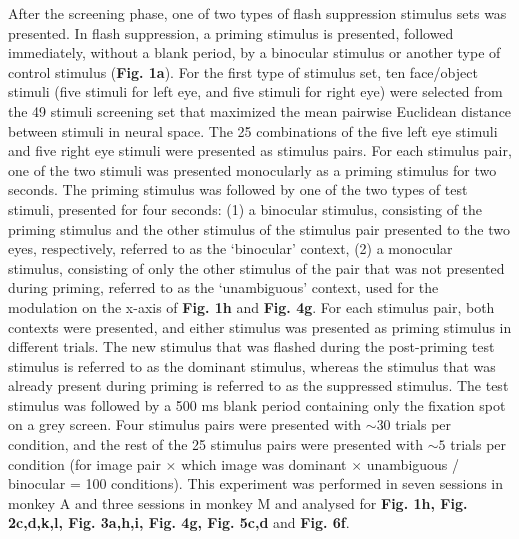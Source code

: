 \documentclass{article}
\begin{document}
After the screening phase, one of two types of flash suppression stimulus sets was presented. In flash suppression, a priming stimulus is presented, followed immediately, without a blank period, by a binocular stimulus or another type of control stimulus (\textbf{Fig. 1a}). For the first type of stimulus set, ten face/object stimuli (five stimuli for left eye, and five stimuli for right eye) were selected from the 49 stimuli screening set that maximized the mean pairwise Euclidean distance between stimuli in neural space. The 25 combinations of the five left eye stimuli and five right eye stimuli were presented as stimulus pairs. For each stimulus pair, one of the two stimuli was presented monocularly as a priming stimulus for two seconds. The priming stimulus was followed by one of the two types of test stimuli, presented for four seconds: (1) a binocular stimulus, consisting of the priming stimulus and the other stimulus of the stimulus pair presented to the two eyes, respectively, referred to as the `binocular' context, (2) a monocular stimulus, consisting of only the other stimulus of the pair that was not presented during priming, referred to as the `unambiguous' context, used for the modulation on the x-axis of \textbf{Fig. 1h} and \textbf{Fig. 4g}. For each stimulus pair, both contexts were presented, and either stimulus was presented as priming stimulus in different trials. The new stimulus that was flashed during the post-priming test stimulus is referred to as the dominant stimulus, whereas the stimulus that was already present during priming is referred to as the suppressed stimulus. The test stimulus was followed by a 500 ms blank period containing only the fixation spot on a grey screen. Four stimulus pairs were presented with ${\sim}30$ trials per condition, and the rest of the 25 stimulus pairs were presented with ${\sim}5$ trials per condition (for image pair $\times$ which image was dominant $\times$ unambiguous / binocular = 100 conditions). This experiment was performed in seven sessions in monkey A and three sessions in monkey M and analysed for \textbf{Fig. 1h, Fig. 2c,d,k,l, Fig. 3a,h,i, Fig. 4g, Fig. 5c,d} and \textbf{Fig. 6f}.
\end{document}
